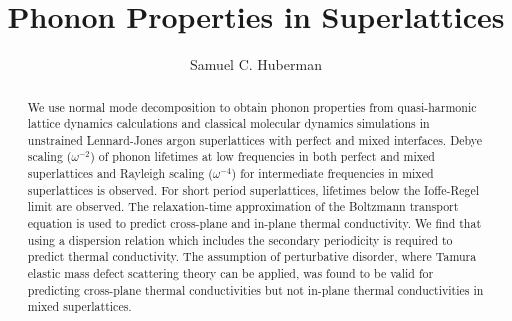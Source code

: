 \documentclass[12pt,doublespaced]{ut-thesis}
\author{Samuel C. Huberman}
\title{Phonon Properties in Superlattices}
\begin{document}
\begin{preliminary}

\maketitle


\begin{abstract}
We use normal mode decomposition to obtain phonon properties from quasi-harmonic lattice dynamics calculations and classical molecular dynamics simulations in unstrained Lennard-Jones argon superlattices with perfect and mixed interfaces. Debye scaling ($\omega^{-2}$) of phonon lifetimes at low frequencies in both perfect and mixed superlattices and Rayleigh scaling ($\omega^{-4}$) for intermediate frequencies in mixed superlattices is observed. For short period superlattices, lifetimes below the Ioffe-Regel limit are observed. The relaxation-time approximation of the Boltzmann transport equation is used to predict cross-plane and in-plane thermal conductivity. We find that using a dispersion relation which includes the secondary periodicity is required to predict thermal conductivity. The assumption of perturbative disorder, where Tamura elastic mass defect scattering theory can be applied, was found to be valid for predicting cross-plane thermal conductivities but not in-plane thermal conductivities in mixed superlattices.
\end{abstract}




\end{preliminary}
\end{document}
